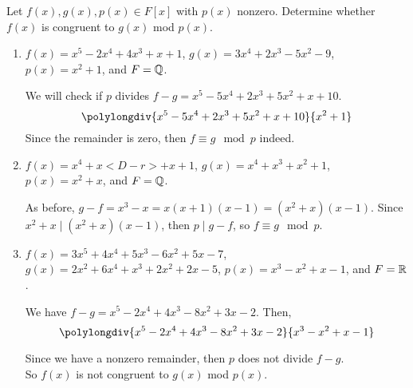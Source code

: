 \documentclass[../hw6]{subfiles}
\begin{document}
\begin{problem}
Let $f(x),g(x),p(x)\in F[x]$ with $p(x)$ nonzero.
Determine whether $f(x)$ is congruent to  $g(x)$ mod  $p(x)$.
\end{problem}
\begin{enumerate}[label=\alph*)]
	\item $f(x)=x^5-2x^4+4x^3+x+1$,  $g(x)=3x^4+2x^3-5x^2-9$,  $p(x)=x^2+1$, and $F=\mathbb{Q}$.

	      We will check if $p$ divides  $f-g=x^5-5x^4+2x^3+5x^2 + x + 10$.
	      \[\polylongdiv{x^5-5x^4+2x^3+5x^2 + x + 10}{x^2+1}\]
	      Since the remainder is zero, then $f \equiv g \mod{p}$ indeed.

	\item $f(x)=x^4 + x<D-r> + x + 1$, $g(x)=x^4 + x^3 + x^2 + 1$, $p(x)=x^2 + x$, and $F=\mathbb{Q}$.

	      As before, $g-f=x^3 - x=x(x + 1)(x - 1)=(x^2 + x)(x-1)$.
	      Since $x^2 + x \mid (x^2 + x)(x-1)$, then $p\mid g-f$, so $f\equiv g \mod{p}$.

	\item $f(x)=3x^5+4x^4 + 5x^3 - 6x^2 + 5x - 7$,
	      $g(x)=2x^2 + 6x^4 + x^3 + 2x^2 + 2x - 5$,
	      $p(x)=x^3 - x^2 + x - 1$, and $F=\mathbb{R}$.

	      We have $f-g=x^5-2x^4+4x^3-8x^2+3x-2$.
	      Then, \[\polylongdiv{x^5-2x^4+4x^3-8x^2+3x-2}{x^3 - x^2 + x - 1}\]

	      Since we have a nonzero remainder, then $p$ does not divide $f-g$. \\
	      So $f(x)$ is not congruent to  $g(x)$ mod  $p(x)$.
\end{enumerate}
\end{document}
